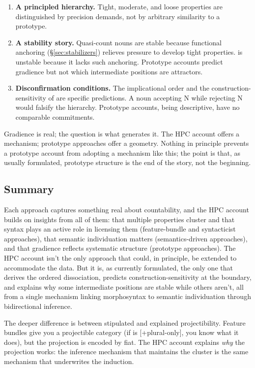\documentclass[12pt,a4paper]{article}
\begin{document}
\begin{enumerate}
\item \textbf{A principled hierarchy.} Tight, moderate, and loose properties are distinguished by precision demands, not by arbitrary similarity to a prototype.
\item \textbf{A stability story.} Quasi-count nouns are stable because functional anchoring (\S\ref{sec:stabilizers}) relieves pressure to develop tight properties.  is unstable because it lacks such anchoring. Prototype accounts predict gradience but not which intermediate positions are attractors.
\item \textbf{Disconfirmation conditions.} The implicational order and the construction-sensitivity of  are specific predictions. A noun accepting  N while rejecting  N would falsify the hierarchy. Prototype accounts, being descriptive, have no comparable commitments.
\end{enumerate}

Gradience is real; the question is what generates it. The HPC account offers a mechanism; prototype approaches offer a geometry. Nothing in principle prevents a prototype account from adopting a mechanism like this; the point is that, as usually formulated, prototype structure is the end of the story, not the beginning.

\subsection{Summary}

Each approach captures something real about countability, and the HPC account builds on insights from all of them: that multiple properties cluster and that syntax plays an active role in licensing them (feature-bundle and syntacticist approaches), that semantic individuation matters (semantics-driven approaches), and that gradience reflects systematic structure (prototype approaches). The HPC account isn't the only approach that could, in principle, be extended to accommodate the data. But it is, as currently formulated, the only one that derives the ordered dissociation, predicts construction-sensitivity at the boundary, and explains why some intermediate positions are stable while others aren't, all from a single mechanism linking morphosyntax to semantic individuation through bidirectional inference.

The deeper difference is between stipulated and explained projectibility. Feature bundles give you a projectible category (if  is [+plural-only], you know what it does), but the projection is encoded by fiat. The HPC account explains \textit{why} the projection works: the inference mechanism that maintains the cluster is the same mechanism that underwrites the induction.
\end{document}

